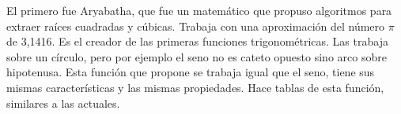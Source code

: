 El primero fue Aryabatha, que fue un matemático que propuso algoritmos para extraer raíces cuadradas y cúbicas. Trabaja con una aproximación del número $\pi$ de 3,1416. Es el creador de las primeras funciones trigonométricas. Las trabaja sobre un círculo, pero por ejemplo el seno no es cateto opuesto sino arco sobre hipotenusa. Esta función que propone se trabaja igual que el seno, tiene sus mismas características y las mismas propiedades. Hace tablas de esta función, similares a las actuales.